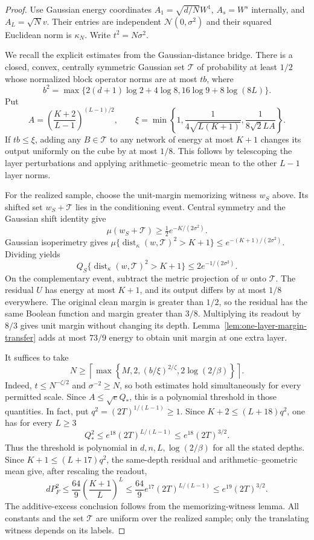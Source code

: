 \begin{proof}
Use Gaussian energy coordinates
$A_1=\sqrt{d/N}W^1$, $A_s=W^s$ internally, and $A_L=\sqrt N v$.
Their entries are independent $\mathcal N(0,\sigma^2)$ and their squared
Euclidean norm is $\kappa_N$. Write $t^2=N\sigma^2$.

We recall the explicit estimates from the Gaussian-distance bridge.
There is a closed, convex, centrally symmetric Gaussian set
$\mathcal T$ of probability at least $1/2$ whose normalized block
operator norms are at most $tb$, where
\[
 b^2=\max\{2(d+1)\log2+4\log8,
                    16\log9+8\log(8L)\}.
\]
Put
\[
 A=\left(\frac{K+2}{L-1}\right)^{(L-1)/2},\qquad
 \xi=\min\left\{1,\frac1{4\sqrt{L(K+1)}},
                         \frac1{8\sqrt2 LA}\right\}.
\]
If $tb\le\xi$, adding any $B\in\mathcal T$ to any network of energy
at most $K+1$ changes its output uniformly on the cube by at most $1/8$.
This follows by telescoping the layer perturbations and applying
arithmetic--geometric mean to the other $L-1$ layer norms.

For the realized sample, choose the unit-margin memorizing witness
$w_S$ above. Its shifted set $w_S+\mathcal T$ lies in the conditioning
event. Central symmetry and the Gaussian shift identity give
\[
 \mu(w_S+\mathcal T)\ge\tfrac12 e^{-K/(2\sigma^2)}.
\]
Gaussian isoperimetry gives
$\mu\{\operatorname{dist}_\kappa(w,\mathcal T)^2>K+1\}
\le e^{-(K+1)/(2\sigma^2)}$. Dividing yields
\[
 Q_S\{\operatorname{dist}_\kappa(w,\mathcal T)^2>K+1\}
       \le2e^{-1/(2\sigma^2)}.
\]
On the complementary event, subtract the metric projection of $w$
onto $\mathcal T$. The residual $U$ has energy at most $K+1$, and
its output differs by at most $1/8$ everywhere. The original clean
margin is greater than $1/2$, so the residual has the same Boolean
function and margin greater than $3/8$. Multiplying its readout by
$8/3$ gives unit margin without changing its depth.
Lemma~\ref{lem:one-layer-margin-transfer} adds at most $73/9$ energy
to obtain unit margin at one extra layer.

It suffices to take
\[
 N\ge\left\lceil\max\left\{M,2,(b/\xi)^{2/\zeta},
                                   2\log(2/\beta)\right\}\right\rceil.
\]
Indeed, $t\le N^{-\zeta/2}$ and $\sigma^{-2}\ge N$, so both estimates
hold simultaneously for every permitted scale. Since
$A\le\sqrt e Q_*$, this is a polynomial threshold in those quantities.
In fact, put $q^2=(2T)^{1/(L-1)}\ge1$. Since
$K+2\le(L+18)q^2$, one has for every $L\ge3$
\[
 Q_*^2\le e^{18}(2T)^{L/(L-1)}
          \le e^{18}(2T)^{3/2}.
\]
Thus the threshold is polynomial in $d,n,L,\log(2/\beta)$ for all
the stated depths. Since $K+1\le(L+17)q^2$, the same-depth residual
and arithmetic--geometric mean give, after rescaling the readout,
\[
 dP_F^2\le\frac{64}{9}\left(\frac{K+1}{L}\right)^L
 \le\frac{64}{9}e^{17}(2T)^{L/(L-1)}
 \le e^{19}(2T)^{3/2}.
\]
The additive-excess conclusion follows from the memorizing-witness
lemma. All constants and the set $\mathcal T$ are uniform over the
realized sample; only the translating witness depends on its labels.
\end{proof}


